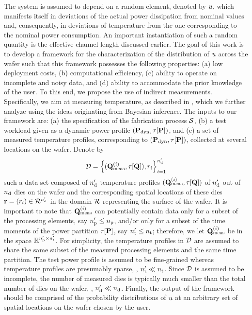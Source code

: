 The system is assumed to depend on a random element, denoted by $u$, which manifests itself in deviations of the actual power dissipation from nominal values and, consequently, in deviations of temperature from the one corresponding to the nominal power consumption.
An important instantiation of such a random quantity is the effective channel length discussed earlier.
The goal of this work is to develop a framework for the characterization of the distribution of $u$ across the wafer such that this framework possesses the following properties: (a) low deployment costs, (b) computational efficiency, (c) ability to operate on incomplete and noisy data, and (d) ability to accommodate the prior knowledge of the user.
To this end, we propose the use of indirect measurements. Specifically, we aim at measuring temperature, as described in , which we further analyze using the ideas originating from Bayesian inference.
The inputs to our framework are: (a) the specification of the fabrication process $\mathcal{S}$, (b) a test workload given as a dynamic power profile $(\mathbf{P}_{\text{dyn}}, \tau[\mathbf{P}])$, and (c) a set of measured temperature profiles, corresponding to $(\mathbf{P}_{\text{dyn}}, \tau[\mathbf{P}])$, collected at several locations on the wafer. Denote by
\[
  \mathcal{D} = \left\{ (\mathbf{Q}^{(i)}_{\text{meas}}, \tau[\mathbf{Q}]), r_i \right\}_{i = 1}^{n_\text{d}'}
\]
such a data set composed of ${n_\text{d}'}$ temperature profiles $(\mathbf{Q}^{(i)}_{\text{meas}}, \tau[\mathbf{Q}])$ of ${n_\text{d}'}$ out of ${n_\text{d}}$ dies on the wafer and the corresponding spatial locations of these dies $\mathbf{r} = (r_i) \in \mathcal{R}^{n_\text{d}'}$ in the domain $\mathcal{R}$ representing the surface of the wafer.
It is important to note that $\mathbf{Q}^{(i)}_{\text{meas}}$ can potentially contain data only for a subset of the processing elements, say ${n_\text{p}'} \leq {n_\text{p}}$, and/or only for a subset of the time moments of the power partition $\tau[\mathbf{P}]$, say ${n_\text{t}'} \leq {n_\text{t}}$; therefore, we let $\mathbf{Q}^{(i)}_{\text{meas}}$ be in the space $\mathbb{R}^{{n_\text{p}'} \times {n_\text{t}'}}$.
For simplicity, the temperature profiles in $\mathcal{D}$ are assumed to share the same subset of the measured processing elements and the same time partition.
The test power profile is assumed to be fine-grained whereas temperature profiles are presumably sparse, \ie, ${n_\text{t}'} \ll {n_\text{t}}$.
Since $\mathcal{D}$ is assumed to be incomplete, the number of measured dies is typically much smaller than the total number of dies on the wafer, \ie, ${n_\text{d}'} \ll {n_\text{d}}$.
Finally, the output of the framework should be comprised of the probability distributions of $u$ at an arbitrary set of spatial locations on the wafer chosen by the user.
